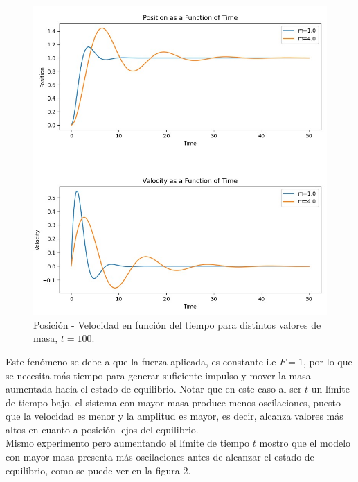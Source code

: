 \documentclass[]{article}
\begin{document}
\begin{figure}[H]
\centering
\includegraphics[width=\textwidth]{../assets/figure_1_mass.jpeg}
\caption{Posición - Velocidad en función del tiempo para distintos valores de masa, $t = 100$.}
\end{figure}


Este fenómeno se debe a que la fuerza aplicada, es constante i.e $F = 1$, por lo que se necesita más tiempo para generar suficiente impulso y mover la masa aumentada hacia el estado de equilibrio. Notar que en este caso al ser $t$ un límite de tiempo bajo, el sistema con mayor masa produce menos oscilaciones, puesto que la velocidad es menor y la amplitud es mayor, es decir, alcanza valores más altos en cuanto a posición lejos del equilibrio.\\

Mismo experimento pero aumentando el límite de tiempo 
$t$ mostro que el modelo con mayor masa presenta más oscilaciones antes de alcanzar el estado de equilibrio, como se puede ver en la figura 2.
\end{document}
